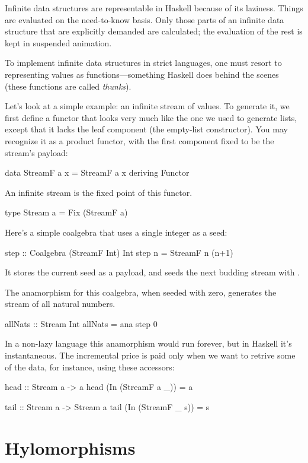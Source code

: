 \documentclass[DaoFP]{subfiles}
\begin{document}
Infinite data structures are representable in Haskell because of its laziness. Things are evaluated on the need-to-know basis. Only those parts of an infinite data structure that are explicitly demanded are calculated; the evaluation of the rest is kept in suspended animation. 

To implement infinite data structures in strict languages, one must resort to representing values as functions---something Haskell does behind the scenes (these functions are called \emph{thunks}).

Let's look at a simple example: an infinite stream of values. To generate it, we first define a functor that looks very much like the one we used to generate lists, except that it lacks the leaf component (the empty-list constructor). You may recognize it as a product functor, with the first component fixed to be the stream's payload:
\begin{haskell}
data StreamF a x = StreamF a x
  deriving Functor
\end{haskell}
An infinite stream is the fixed point of this functor.
\begin{haskell}
type Stream a = Fix (StreamF a)
\end{haskell}
Here's a simple coalgebra that uses a single integer  as a seed:
\begin{haskell}
step :: Coalgebra (StreamF Int) Int
step n = StreamF n (n+1)
\end{haskell}
It stores the current seed as a payload, and seeds the next budding stream with . 

The anamorphism for this coalgebra, when seeded with zero, generates the stream of all natural numbers.
\begin{haskell}
allNats :: Stream Int
allNats = ana step 0
\end{haskell}
In a non-lazy language this anamorphism would run forever, but in Haskell it's instantaneous. The incremental price is paid only when we want to retrive some of the data, for instance, using these accessors:
\begin{haskell}
head :: Stream a -> a
head (In (StreamF a _)) = a

tail :: Stream a -> Stream a
tail (In (StreamF _ s)) = s
\end{haskell}


\section{Hylomorphisms}
\end{document}
